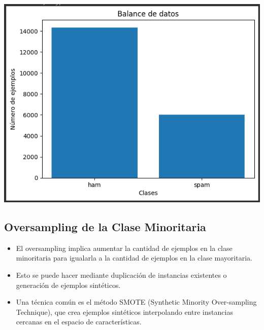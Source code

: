 \begin{center}
    \includegraphics[scale = .4]{IMA/balancedatos.png}
\end{center}


\subsection{Oversampling de la Clase Minoritaria}

\begin{itemize}
    \item El oversampling implica aumentar la cantidad de ejemplos en la clase minoritaria para igualarla a la cantidad de ejemplos en la clase mayoritaria.
    \item Esto se puede hacer mediante duplicación de instancias existentes o generación de ejemplos sintéticos.
    \item Una técnica común es el método SMOTE (Synthetic Minority Over-sampling Technique), que crea ejemplos sintéticos interpolando entre instancias cercanas en el espacio de características.
\end{itemize}


